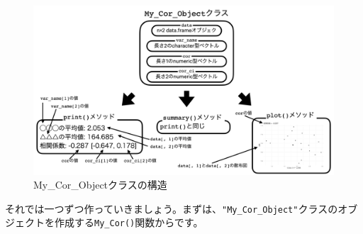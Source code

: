 \documentclass[
  a4paper,
  pandoc,
  ja=standard,
  jafont=haranoaji]{bxjsbook}
\begin{document}
\begin{figure}

{\centering \includegraphics[width=1\textwidth,height=\textheight]{./Figs/OOP/My_Cor_Object.png}

}

\caption{\label{fig-map_my_cor_object}My\_Cor\_Objectクラスの構造}

\end{figure}

それでは一つずつ作っていきましょう。まずは、\texttt{"My\_Cor\_Object"}クラスのオブジェクトを作成する\texttt{My\_Cor()}関数からです。
\end{document}
